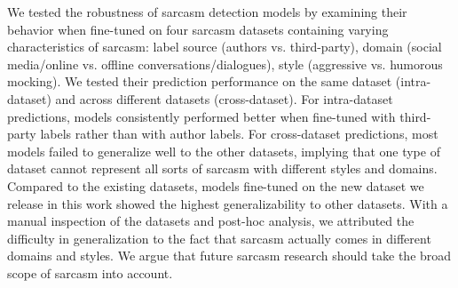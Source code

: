 We tested the robustness of sarcasm detection models by examining their behavior when fine-tuned on four sarcasm datasets containing varying characteristics of sarcasm: label source (authors vs. third-party), domain (social media/online vs. offline conversations/dialogues), style (aggressive vs. humorous mocking). We tested their prediction performance on the same dataset (intra-dataset) and across different datasets (cross-dataset). For intra-dataset predictions, models consistently performed better when fine-tuned with third-party labels rather than with author labels. For cross-dataset predictions, most models failed to generalize well to the other datasets, implying that one type of dataset cannot represent all sorts of sarcasm with different styles and domains. Compared to the existing datasets, models fine-tuned on the new dataset we release in this work showed the highest generalizability to other datasets.  With a manual inspection of the datasets and post-hoc analysis, we attributed the difficulty in generalization to the fact that sarcasm actually comes in different domains and styles. We argue that future sarcasm research should take the broad scope of sarcasm into account.